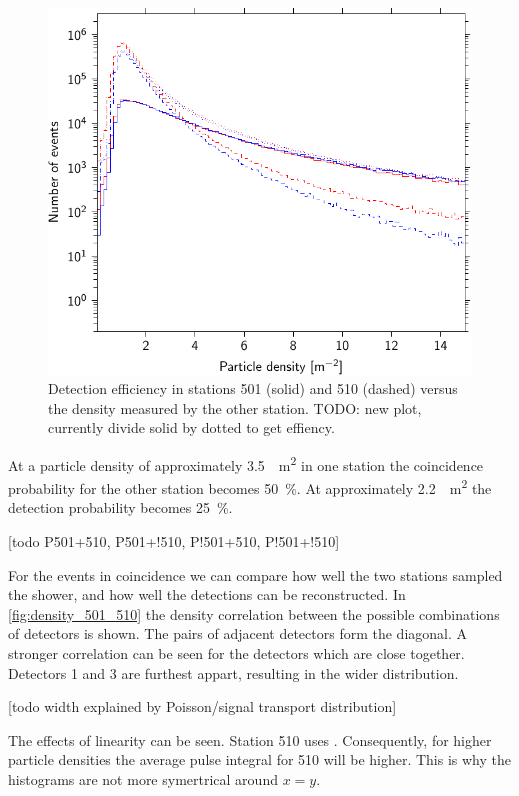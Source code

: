 \begin{figure}
    \centering
    \includegraphics{plots/station/anti_coincidences}
    \caption{Detection efficiency in stations 501 (solid) and 510 (dashed) versus the density measured by the other station. TODO: new plot, currently divide solid by dotted to get effiency.}
    \label{fig:effiency_501_510}
\end{figure}

At a particle density of approximately \SI{3.5}{\per\square\meter} in one station the coincidence probability for the other station becomes \SI{50}{\percent}. At approximately \SI{2.2}{\per\square\meter} the detection probability becomes \SI{25}{\percent}.

[todo P{501+510}, P{501+!510}, P{!501+510}, P{!501+!510}]

For the events in coincidence we can compare how well the two stations sampled the shower, and how well the detections can be reconstructed. In \cref{fig:density_501_510} the density correlation between the possible combinations of detectors is shown. The pairs of adjacent detectors form the diagonal. A stronger correlation can be seen for the detectors which are close together. Detectors 1 and 3 are furthest appart, resulting in the wider distribution.

[todo width explained by Poisson/signal transport distribution]

The effects of \pmt linearity can be seen. Station 510 uses \nikhef \pmts. Consequently, for higher particle densities the average pulse integral for 510 will be higher. This is why the histograms are not more symertrical around $x = y$.

